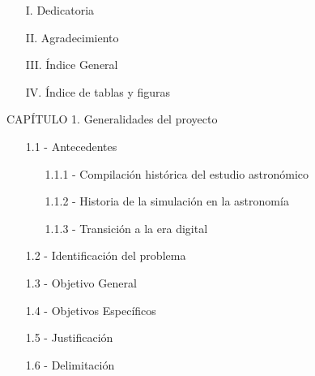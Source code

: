 \begin{enumerate}
  \item[I.] Dedicatoria
  \item[II.] Agradecimiento
  \item[III.] Índice General
  \item[IV.] Índice de tablas y figuras
\end{enumerate}

\vspace{1em}
CAPÍTULO 1. Generalidades del proyecto
\begin{enumerate}
  \item[1.1 -] Antecedentes
  \begin{enumerate}
    \item[1.1.1 -] Compilación histórica del estudio astronómico
    \item[1.1.2 -] Historia de la simulación en la astronomía
    \item[1.1.3 -] Transición a la era digital
  \end{enumerate}
  \item[1.2 -] Identificación del problema
  \item[1.3 -] Objetivo General
  \item[1.4 -] Objetivos Específicos
  \item[1.5 -] Justificación
  \item[1.6 -] Delimitación
\end{enumerate}

